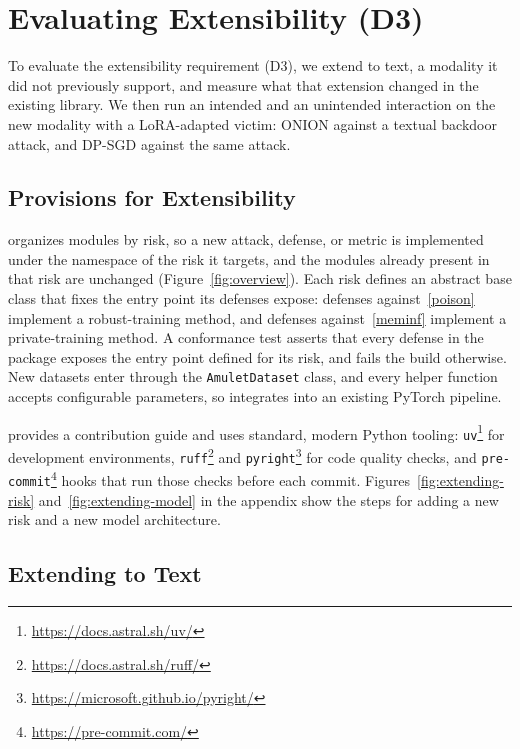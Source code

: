 \section{Evaluating Extensibility (D3)}\label{sec:extensibility}

To evaluate the extensibility requirement (D3), we extend \method to text, a modality it did not previously support, and measure what that extension changed in the existing library.
We then run an intended and an unintended interaction on the new modality with a LoRA-adapted \llama victim: ONION against a textual backdoor attack, and DP-SGD against the same attack.

\subsection{Provisions for Extensibility}

\method organizes modules by risk, so a new attack, defense, or metric is implemented under the namespace of the risk it targets, and the modules already present in that risk are unchanged (Figure~\ref{fig:overview}).
Each risk defines an abstract base class that fixes the entry point its defenses expose: defenses against~\ref{poison} implement a robust-training method, and defenses against~\ref{meminf} implement a private-training method.
A conformance test asserts that every defense in the package exposes the entry point defined for its risk, and fails the build otherwise.
New datasets enter through the \texttt{AmuletDataset} class, and every helper function accepts configurable parameters, so \method integrates into an existing PyTorch pipeline.

\method provides a contribution guide and uses standard, modern Python tooling: \texttt{uv}\footnote{\url{https://docs.astral.sh/uv/}} for development environments, \texttt{ruff}\footnote{\url{https://docs.astral.sh/ruff/}} and \texttt{pyright}\footnote{\url{https://microsoft.github.io/pyright/}} for code quality checks, and \texttt{pre-commit}\footnote{\url{https://pre-commit.com/}} hooks that run those checks before each commit.
Figures~\ref{fig:extending-risk} and~\ref{fig:extending-model} in the appendix show the steps for adding a new risk and a new model architecture.

\subsection{Extending \method to Text}

